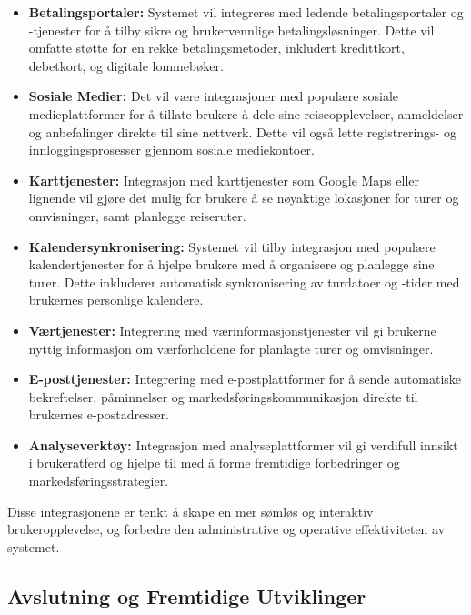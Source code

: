 \documentclass[../doc.tex]{subfiles}
\begin{document}
\begin{itemize}
    \item \textbf{Betalingsportaler:} Systemet vil integreres med ledende betalingsportaler og -tjenester for å tilby sikre og brukervennlige betalingsløsninger. 
    Dette vil omfatte støtte for en rekke betalingsmetoder, inkludert kredittkort, debetkort, og digitale lommebøker.

    \item \textbf{Sosiale Medier:} Det vil være integrasjoner med populære sosiale medieplattformer for å tillate brukere å dele sine reiseopplevelser, anmeldelser og anbefalinger direkte til sine nettverk. 
    Dette vil også lette registrerings- og innloggingsprosesser gjennom sosiale mediekontoer.

    \item \textbf{Karttjenester:} Integrasjon med karttjenester som Google Maps eller lignende vil gjøre det mulig for brukere å se nøyaktige lokasjoner for turer og omvisninger, samt planlegge reiseruter.

    \item \textbf{Kalendersynkronisering:} Systemet vil tilby integrasjon med populære kalendertjenester for å hjelpe brukere med å organisere og planlegge sine turer. 
    Dette inkluderer automatisk synkronisering av turdatoer og -tider med brukernes personlige kalendere.

    \item \textbf{Værtjenester:} Integrering med værinformasjonstjenester vil gi brukerne nyttig informasjon om værforholdene for planlagte turer og omvisninger.

    \item \textbf{E-posttjenester:} Integrering med e-postplattformer for å sende automatiske bekreftelser, påminnelser og markedsføringskommunikasjon direkte til brukernes e-postadresser.

    \item \textbf{Analyseverktøy:} Integrasjon med analyseplattformer vil gi verdifull innsikt i brukeratferd og hjelpe til med å forme fremtidige forbedringer og markedsføringsstrategier.
\end{itemize}

Disse integrasjonene er tenkt å skape en mer sømløs og interaktiv brukeropplevelse, og forbedre den administrative og operative effektiviteten av systemet.

\subsection{Avslutning og Fremtidige Utviklinger}
\end{document}
